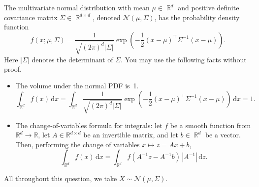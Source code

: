 \documentclass{article}
\DeclareMathOperator{\R}{\mathbb{R}}
\begin{document}
The multivariate normal distribution with mean $\mu \in \R^d$ and positive definite covariance matrix $\Sigma \in \R^{d\times d}$, denoted $\mathcal{N}(\mu, \Sigma)$, has the probability density function
\[
    f(x; \mu, \Sigma) = \frac{1}{\sqrt{(2\pi)^d|\Sigma|}} \exp\left(-\frac{1}{2} (x - \mu)^\top \Sigma^{-1} (x - \mu)\right).
\]
Here $|\Sigma|$ denotes the determinant of $\Sigma$. 
You may use the following facts without proof.
\begin{itemize}
    \item 
    The volume under the normal PDF is~1.
    \[
        \int_{\R^d} f(x)\,\mathrm dx = \int_{\R^d} \frac{1}{\sqrt{(2\pi)^d|\Sigma|}} \exp\left(-\frac{1}{2} (x - \mu)^\top \Sigma^{-1} (x - \mu)\right)\,\mathrm dx = 1.
    \]
    \item 
    The change-of-variables formula for integrals: let $f$ be a smooth function from $\mathbb R^d \to \mathbb R$,  let $A\in\mathbb R^{d \times d}$ be an invertible matrix, and let $b \in \R^d$ be a vector. 
    Then, performing the change of variables $x \mapsto z = Ax + b$,  
    \[
        \int_{\R^d} f(x)\, \mathrm dx = \int_{\R^d} f(A^{-1}z - A^{-1}b)\, |A^{-1}| \,\mathrm dz.
    \]
\end{itemize}
All throughout this question, we take $X \sim \mathcal{N}(\mu, \Sigma)$.
\end{document}
